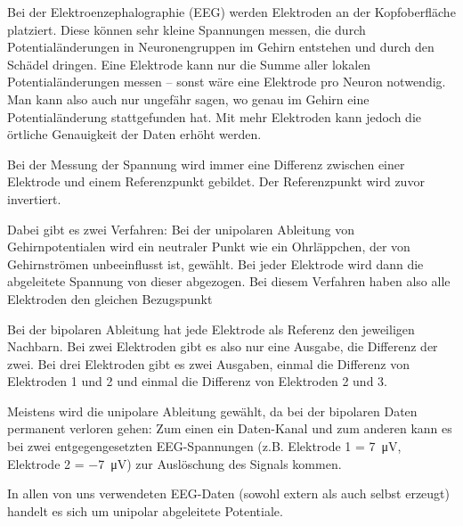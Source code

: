 \documentclass[10pt]{article}
\begin{document}
Bei der Elektroenzephalographie (EEG) werden Elektroden an der Kopfoberfläche platziert. 
Diese können sehr kleine Spannungen messen, die durch Potentialänderungen in Neuronengruppen im Gehirn entstehen und durch den Schädel dringen. 
Eine Elektrode kann nur die Summe aller lokalen Potentialänderungen messen -- sonst wäre eine Elektrode pro Neuron notwendig. 
Man kann also auch nur ungefähr sagen, wo genau im Gehirn eine Potentialänderung stattgefunden hat. 
Mit mehr Elektroden kann jedoch die örtliche Genauigkeit der Daten erhöht werden.

Bei der Messung der Spannung wird immer eine Differenz zwischen einer Elektrode und einem Referenzpunkt gebildet.
Der Referenzpunkt wird zuvor invertiert.

Dabei gibt es zwei Verfahren: Bei der unipolaren Ableitung von Gehirnpotentialen wird ein neutraler Punkt wie ein Ohrläppchen, der von Gehirnströmen unbeeinflusst ist, gewählt. 
Bei jeder Elektrode wird dann die abgeleitete Spannung von dieser abgezogen.
Bei diesem Verfahren haben also alle Elektroden den gleichen Bezugspunkt

Bei der bipolaren Ableitung hat jede Elektrode als Referenz den jeweiligen Nachbarn.
Bei zwei Elektroden gibt es also nur eine Ausgabe, die Differenz der zwei.
Bei drei Elektroden gibt es zwei Ausgaben, einmal die Differenz von Elektroden 1 und 2 und einmal die Differenz von Elektroden 2 und 3. \cite{EEGHausarbeit}

Meistens wird die unipolare Ableitung gewählt, da bei der bipolaren Daten permanent verloren gehen: Zum einen ein Daten-Kanal und zum anderen kann es bei zwei entgegengesetzten EEG-Spannungen (z.B. Elektrode 1 = \SI{7}{\micro\volt}, Elektrode 2 = \SI{-7}{\micro\volt}) zur Auslöschung des Signals kommen. \cite{EEGHausarbeit}

In allen von uns verwendeten EEG-Daten (sowohl extern als auch selbst erzeugt) handelt es sich um unipolar abgeleitete Potentiale.


\end{document}
